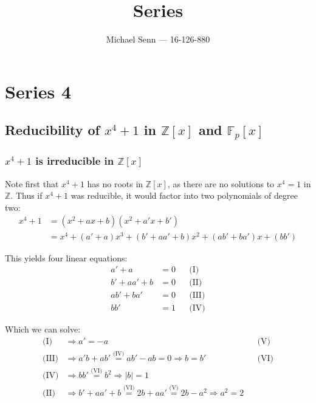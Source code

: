 \documentclass[a4paper]{scrreprt}
\title{Series \series}
\author{Michael Senn \maillink{michael.senn@students.unibe.ch} --- 16-126-880}
\date{\printdate}
\newcommand{\series}{4}
\begin{document}
\maketitle


\setcounter{chapter}{\numexpr \series - 1 \relax}

\chapter{Series \series}

\section{Reducibility of $x^4 + 1$ in $\mathbb{Z}[x]$ and $\mathbb{F}_p[x]$}

\subsection{$x^4 + 1$ is irreducible in $\mathbb{Z}[x]$}

Note first that $x^4 + 1$ has no roots in $\mathbb{Z}[x]$, as there are no
solutions to $x^4 = 1$ in $\mathbb{Z}$. Thus if $x^4 + 1$ was reducible, it
would factor into two polynomials of degree two:
\begin{align*}
		x^4 + 1 & = (x^2 + ax + b) (x^2 + a'x + b') \\
				& = x^4 + (a' + a) x^3 + (b' + aa' + b) x^2 + (ab' + ba') x + (bb')
\end{align*}

This yields four linear equations:
\begin{align*}
		a' + a & = 0 && \text{(I)} \\
		b' + aa' + b & = 0 && \text{(II)} \\
		ab' + ba' & = 0 && \text{(III)} \\
		bb' & = 1 && \text{(IV)}
\end{align*}

Which we can solve:
\begin{align*}
		\text{(I)} & \Rightarrow a' = -a && \text{(V)} \\
		\text{(III)} & \Rightarrow a'b + ab' 
		               \stackrel{\text{(IV)}}{=} ab' - ab = 0 
		               \Rightarrow b = b' && \text{(VI)} \\
		\text{(IV)} & \Rightarrow bb' 
		               \stackrel{\text{(VI)}}{=} b^2 
				       \Rightarrow |b| = 1 \\
		\text{(II)} & \Rightarrow b' + aa' + b 
		              \stackrel{\text{(VI)}}{=} 2b + aa' 
					  \stackrel{\text{(V)}}{=} 2b - a^2
					  \Rightarrow a^2 = 2
\end{align*}
\end{document}
